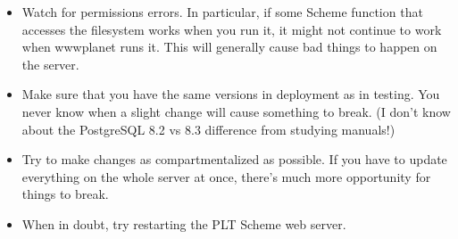 \documentclass{article}
\begin{document}
\begin{itemize}
\item Watch for permissions errors. In particular, if some Scheme function
  that accesses the filesystem works when you run it, it might not
  continue to work when wwwplanet runs it. This will generally cause
  bad things to happen on the server.

\item Make sure that you have the same versions in deployment as in
  testing. You never know when a slight change will cause something to
  break. (I don't know about the PostgreSQL 8.2 vs 8.3 difference from
  studying manuals!)

\item Try to make changes as compartmentalized as possible. If you have to
  update everything on the whole server at once, there's much more
  opportunity for things to break.

\item When in doubt, try restarting the PLT Scheme web server.
\end{itemize}
\end{document}
